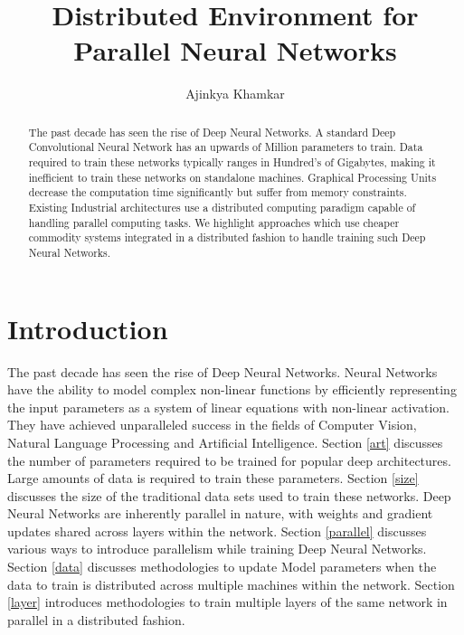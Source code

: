 \documentclass[sigconf]{acmart}
\begin{document}
\title{Distributed Environment for Parallel Neural Networks}


\author{Ajinkya Khamkar}

\renewcommand{\shortauthors}{K. Ajinkya}


\begin{abstract}
The past decade has seen the rise of Deep Neural Networks. A standard Deep Convolutional Neural Network has an upwards of Million parameters to train. Data required to train these networks typically ranges in Hundred's of Gigabytes, making it inefficient to train these networks on standalone machines. Graphical Processing Units decrease the computation time significantly but suffer from memory constraints. Existing Industrial architectures use a distributed computing paradigm capable of handling parallel computing tasks. We highlight approaches which use cheaper commodity systems integrated in a distributed fashion to handle training such Deep Neural Networks.
\end{abstract}



\maketitle

\section{Introduction}

The past decade has seen the rise of Deep Neural Networks. Neural Networks have the ability to model complex non-linear functions by efficiently representing the input parameters as a system of linear equations with non-linear activation\cite{NIPS2012-4824}. They have achieved unparalleled success in the fields of Computer Vision, Natural Language Processing and Artificial Intelligence. Section \ref{art} discusses the number of parameters required to be trained for popular deep architectures. Large amounts of data is required to train these parameters. Section \ref{size} discusses the size of the traditional data sets used to train these networks. Deep Neural Networks are inherently parallel in nature, with weights and gradient updates shared across layers within the network. Section \ref{parallel} discusses various ways to introduce parallelism while training Deep Neural Networks. Section \ref{data} discusses methodologies to update Model parameters when the data to train is distributed across multiple machines within the network.  Section \ref{layer} introduces methodologies to train multiple layers of the same network in parallel in a distributed fashion. 
\end{document}
